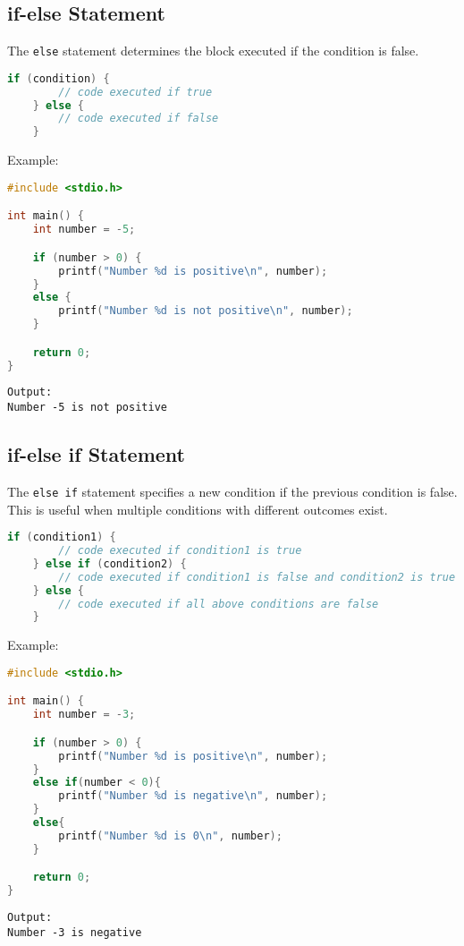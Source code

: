 \subsection{if-else Statement}

The \verb|else| statement determines the block executed if the condition is false.

{
\captionsetup[lstlisting]{labelformat=empty, justification=raggedright, singlelinecheck=false}
\begin{lstlisting}[language=c, caption={Syntax}]
	if (condition) {
		// code executed if true
	} else {
		// code executed if false
	}
\end{lstlisting}
}

Example:
\begin{lstlisting}[language=c]
#include <stdio.h>

int main() {
	int number = -5;

	if (number > 0) {
		printf("Number %d is positive\n", number);
	}
	else {
		printf("Number %d is not positive\n", number);
	}

	return 0;
}
\end{lstlisting}
\begin{verbatim}
Output:
Number -5 is not positive
\end{verbatim}

\subsection{if-else if Statement}

The \verb|else if| statement specifies a new condition if the previous condition is false.  
This is useful when multiple conditions with different outcomes exist.

{
\captionsetup[lstlisting]{labelformat=empty, justification=raggedright, singlelinecheck=false}
\begin{lstlisting}[language=c, caption={Syntax}]
	if (condition1) {
		// code executed if condition1 is true
	} else if (condition2) {
		// code executed if condition1 is false and condition2 is true
	} else {
		// code executed if all above conditions are false
	}
\end{lstlisting}
}

Example:
\begin{lstlisting}[language=c]
#include <stdio.h>

int main() {
	int number = -3;

	if (number > 0) {
		printf("Number %d is positive\n", number);
	}
	else if(number < 0){
		printf("Number %d is negative\n", number);
	}
	else{
		printf("Number %d is 0\n", number);
	}

	return 0;
}
\end{lstlisting}
\begin{verbatim}
Output:
Number -3 is negative
\end{verbatim}

